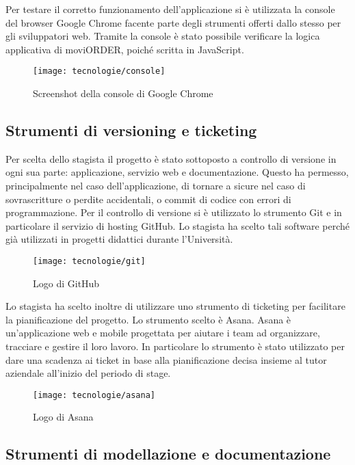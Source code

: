 Per testare il corretto funzionamento dell'applicazione si è utilizzata la console del browser Google Chrome facente parte degli strumenti offerti dallo stesso per gli sviluppatori web. Tramite la console è stato possibile verificare la logica applicativa di moviORDER, poiché scritta in JavaScript.

\begin{figure}[!h] 
    \centering 
    \texttt{[image: tecnologie/console]} 
    \caption{Screenshot della console di Google Chrome}
\end{figure}

\newpage

\subsection{Strumenti di versioning e ticketing}

Per scelta dello stagista il progetto è stato sottoposto a controllo di versione in ogni sua parte: applicazione, servizio web e documentazione. Questo ha permesso, principalmente nel caso dell'applicazione, di tornare a  sicure nel caso di sovrascritture o perdite accidentali, o commit di codice con errori di programmazione. Per il controllo di versione si è utilizzato lo strumento Git e in particolare il servizio di hosting GitHub. Lo stagista ha scelto tali software perché già utilizzati in progetti didattici durante l'Università.

\begin{figure}[!h] 
    \centering 
    \texttt{[image: tecnologie/git]} 
    \caption{Logo di GitHub}
\end{figure}

Lo stagista ha scelto inoltre di utilizzare uno strumento di ticketing per facilitare la pianificazione del progetto. Lo strumento scelto è Asana. Asana è un'applicazione web e mobile progettata per aiutare i team ad organizzare, tracciare e gestire il loro lavoro. In particolare lo strumento è stato utilizzato per dare una scadenza ai ticket in base alla pianificazione decisa insieme al tutor aziendale all'inizio del periodo di stage.

\begin{figure}[!h] 
    \centering 
    \texttt{[image: tecnologie/asana]} 
    \caption{Logo di Asana}
\end{figure}

\subsection{Strumenti di modellazione e documentazione}

